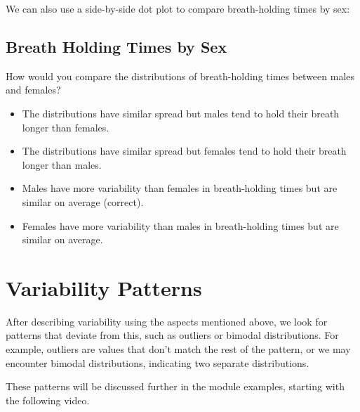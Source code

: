 \documentclass{article}
\begin{document}
\noindent We can also use a side-by-side dot plot to compare breath-holding times by sex:


\subsection*{Breath Holding Times by Sex}

How would you compare the distributions of breath-holding times between males and females?

\begin{itemize}
    \item The distributions have similar spread but males tend to hold their breath longer than females.
    \item The distributions have similar spread but females tend to hold their breath longer than males.
    \item Males have more variability than females in breath-holding times but are similar on average (correct).
    \item Females have more variability than males in breath-holding times but are similar on average.
\end{itemize}

\section*{Variability Patterns}

After describing variability using the aspects mentioned above, we look for patterns that deviate from this, such as outliers or bimodal distributions. For example, outliers are values that don't match the rest of the pattern, or we may encounter bimodal distributions, indicating two separate distributions.

These patterns will be discussed further in the module examples, starting with the following video.
\end{document}
